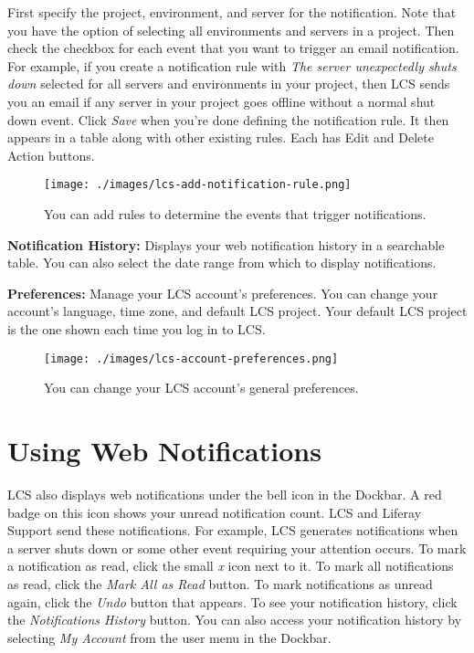 First specify the project, environment, and server for the notification.
Note that you have the option of selecting all environments and servers
in a project. Then check the checkbox for each event that you want to
trigger an email notification. For example, if you create a notification
rule with \emph{The server unexpectedly shuts down} selected for all
servers and environments in your project, then LCS sends you an email if
any server in your project goes offline without a normal shut down
event. Click \emph{Save} when you're done defining the notification
rule. It then appears in a table along with other existing rules. Each
has Edit and Delete Action buttons.

\begin{figure}
\centering
\texttt{[image: ./images/lcs-add-notification-rule.png]}
\caption{You can add rules to determine the events that trigger
notifications.}
\end{figure}

\textbf{Notification History:} Displays your web notification history in
a searchable table. You can also select the date range from which to
display notifications.

\textbf{Preferences:} Manage your LCS account's preferences. You can
change your account's language, time zone, and default LCS project. Your
default LCS project is the one shown each time you log in to LCS.

\begin{figure}
\centering
\texttt{[image: ./images/lcs-account-preferences.png]}
\caption{You can change your LCS account's general preferences.}
\end{figure}

\section{Using Web Notifications}\label{using-web-notifications}

LCS also displays web notifications under the bell icon in the Dockbar.
A red badge on this icon shows your unread notification count. LCS and
Liferay Support send these notifications. For example, LCS generates
notifications when a server shuts down or some other event requiring
your attention occurs. To mark a notification as read, click the small
\emph{x} icon next to it. To mark all notifications as read, click the
\emph{Mark All as Read} button. To mark notifications as unread again,
click the \emph{Undo} button that appears. To see your notification
history, click the \emph{Notifications History} button. You can also
access your notification history by selecting \emph{My Account} from the
user menu in the Dockbar.

